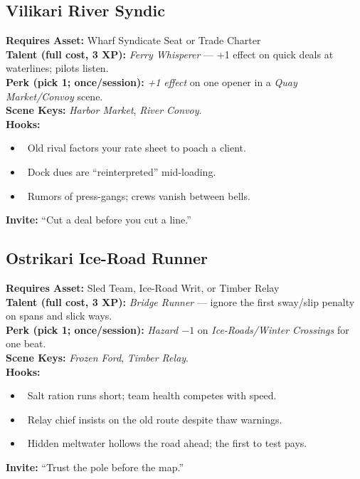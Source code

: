 \documentclass[11pt]{article}
\begin{document}
\subsection*{Vilikari River Syndic}
\textbf{Requires Asset:} Wharf Syndicate Seat or Trade Charter\\
\textbf{Talent (full cost, 3 XP):} \emph{Ferry Whisperer} — +1 effect on quick deals at waterlines; pilots listen.\\
\textbf{Perk (pick 1; once/session):} \emph{+1 effect} on one opener in a \emph{Quay Market/Convoy} scene.\\
\textbf{Scene Keys:} \emph{Harbor Market}, \emph{River Convoy}.\\[2pt]
\textbf{Hooks:}
\begin{itemize}
  \item \heartsuit~Old rival factors your rate sheet to poach a client.
  \item \diamondsuit~Dock dues are “reinterpreted” mid-loading.
  \item \spadesuit~Rumors of press-gangs; crews vanish between bells.
\end{itemize}
\textbf{Invite:} “Cut a deal before you cut a line.”

\subsection*{Ostrikari Ice-Road Runner}
\textbf{Requires Asset:} Sled Team, Ice-Road Writ, or Timber Relay\\
\textbf{Talent (full cost, 3 XP):} \emph{Bridge Runner} — ignore the first sway/slip penalty on spans and slick ways.\\
\textbf{Perk (pick 1; once/session):} \emph{Hazard $-1$} on \emph{Ice-Roads/Winter Crossings} for one beat.\\
\textbf{Scene Keys:} \emph{Frozen Ford}, \emph{Timber Relay}.\\[2pt]
\textbf{Hooks:}
\begin{itemize}
  \item \diamondsuit~Salt ration runs short; team health competes with speed.
  \item \clubsuit~Relay chief insists on the old route despite thaw warnings.
  \item \spadesuit~Hidden meltwater hollows the road ahead; the first to test pays.
\end{itemize}
\textbf{Invite:} “Trust the pole before the map.”
\end{document}
